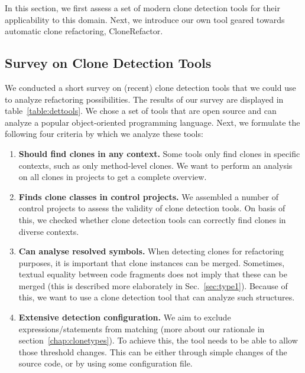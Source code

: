 \documentclass[a4paper]{article}
\begin{document}
In this section, we first assess a set of modern clone detection tools for their applicability to this domain. Next, we introduce our own tool geared towards automatic clone refactoring, CloneRefactor.%

\subsection{Survey on Clone Detection Tools}
\label{ch:tool-overview}
We conducted a short survey on (recent) clone detection tools that we could use to analyze refactoring possibilities. The results of our survey are displayed in table~\ref{table:dettools}. We chose a set of tools that are open source and can analyze a popular object-oriented programming language. Next, we formulate the following four criteria by which we analyze these tools:
\begin{enumerate}
    \item \textbf{Should find clones in any context.} Some tools only find clones in specific contexts, such as only method-level clones. We want to perform an analysis on all clones in projects to get a complete overview.
\item \textbf{Finds clone classes in control projects.} We assembled a number of control projects to assess the validity of clone detection tools. On basis of this, we checked whether clone detection tools can correctly find clones in diverse contexts.
\item \textbf{Can analyse resolved symbols.} When detecting clones for refactoring purposes, it is important that clone instances can be merged. Sometimes, textual equality between code fragments does not imply that these can be merged (this is described more elaborately in Sec.~\ref{sec:type1}). Because of this, we want to use a clone detection tool that can analyze such structures.
\item \textbf{Extensive detection configuration.} We aim to exclude expressions/statements from matching (more about our rationale in section~\ref{chap:clonetypes}). To achieve this, the tool needs to be able to allow those threshold changes. This can be either through simple changes of the source code, or by using some configuration file.
\end{enumerate}
\end{document}
